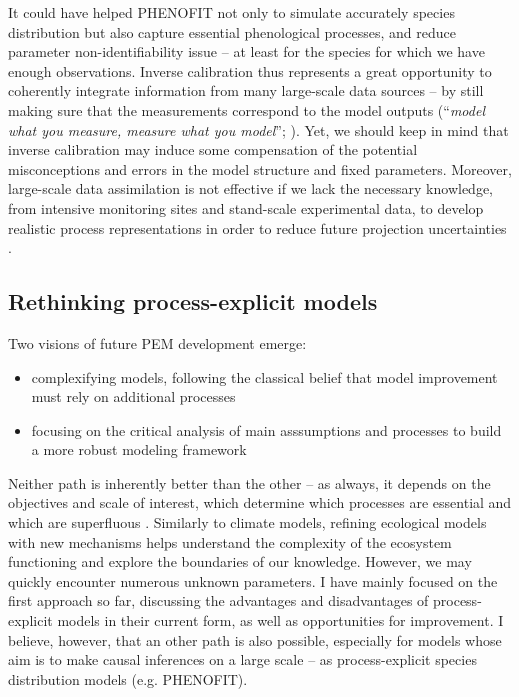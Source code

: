 It could have helped PHENOFIT not only to simulate accurately species distribution but also capture essential phenological processes, and reduce parameter non-identifiability issue \citep{Zipkin2021} -- at least for the species for which we have enough observations. Inverse calibration thus represents a great opportunity to coherently integrate information from many large-scale data sources -- by still making sure that the measurements correspond to the model outputs (“\emph{model what you measure, measure what you model}”; \citealp{Fisher2014}). Yet, we should keep in mind that inverse calibration may induce some compensation of the potential misconceptions and errors in the model structure and fixed parameters. Moreover, large-scale data assimilation is not effective if we lack the necessary knowledge, from intensive monitoring sites and stand-scale experimental data, to develop realistic process representations in order to reduce future projection uncertainties \citep{Keenan2012}. 

\subsection{Rethinking process-explicit models}

Two visions of future PEM development emerge:
\begin{itemize}
\item complexifying models, following the classical belief that model improvement must rely on additional processes \citep{Fisher2014}
\item focusing on the critical analysis of main asssumptions and processes to build a more robust modeling framework \citep{Harrison2021}
\end{itemize}

Neither path is inherently better than the other -- as always, it depends on the objectives and scale of interest, which determine which processes are essential and which are superfluous \citep{Bugmann2022}. Similarly to climate models, refining ecological models with new mechanisms helps understand the complexity of the ecosystem functioning and explore the boundaries of our knowledge. However, we may quickly encounter numerous unknown parameters. I have mainly focused on the first approach so far, discussing the advantages and disadvantages of process-explicit models in their current form, as well as opportunities for improvement. I believe, however, that an other path is also possible, especially for models whose aim is to make causal inferences on a large scale -- as process-explicit species distribution models (e.g. PHENOFIT). 

